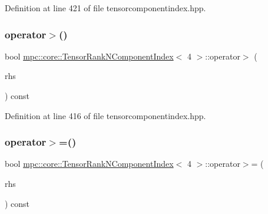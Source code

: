Definition at line 421 of file tensorcomponentindex.\+hpp.

\mbox{\label{classmpc_1_1core_1_1_tensor_rank_n_component_index_3_014_01_4_ab150acacce0779a041b8d40e484bc734}} 
\subsubsection{\texorpdfstring{operator$>$()}{operator>()}}
{\footnotesize\ttfamily bool \mbox{\hyperlink{classmpc_1_1core_1_1_tensor_rank_n_component_index}{mpc\+::core\+::\+Tensor\+Rank\+N\+Component\+Index}}$<$ 4 $>$\+::operator$>$ (\begin{DoxyParamCaption}\item[{const \mbox{\hyperlink{classmpc_1_1core_1_1_tensor_rank_n_component_index}{Tensor\+Rank\+N\+Component\+Index}}$<$ 4 $>$ \&}]{rhs }\end{DoxyParamCaption}) const\hspace{0.3cm}{\ttfamily [inline]}}



Definition at line 416 of file tensorcomponentindex.\+hpp.

\mbox{\label{classmpc_1_1core_1_1_tensor_rank_n_component_index_3_014_01_4_a8a4bc0a78a02a19e01e7742e328197f4}} 
\subsubsection{\texorpdfstring{operator$>$=()}{operator>=()}}
{\footnotesize\ttfamily bool \mbox{\hyperlink{classmpc_1_1core_1_1_tensor_rank_n_component_index}{mpc\+::core\+::\+Tensor\+Rank\+N\+Component\+Index}}$<$ 4 $>$\+::operator$>$= (\begin{DoxyParamCaption}\item[{const \mbox{\hyperlink{classmpc_1_1core_1_1_tensor_rank_n_component_index}{Tensor\+Rank\+N\+Component\+Index}}$<$ 4 $>$ \&}]{rhs }\end{DoxyParamCaption}) const\hspace{0.3cm}{\ttfamily [inline]}}



